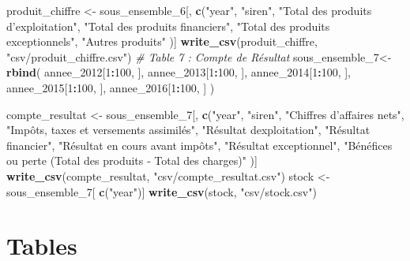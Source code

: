 \documentclass[mstat,12pt]{unswthesis}
\newenvironment{Shaded}{\begin{snugshade}}{\end{snugshade}}
\newcommand{\CommentTok}[1]{\textcolor[rgb]{0.56,0.35,0.01}{\textit{#1}}}
\newcommand{\DecValTok}[1]{\textcolor[rgb]{0.00,0.00,0.81}{#1}}
\newcommand{\FunctionTok}[1]{\textcolor[rgb]{0.13,0.29,0.53}{\textbf{#1}}}
\newcommand{\NormalTok}[1]{#1}
\newcommand{\OtherTok}[1]{\textcolor[rgb]{0.56,0.35,0.01}{#1}}
\newcommand{\SpecialCharTok}[1]{\textcolor[rgb]{0.81,0.36,0.00}{\textbf{#1}}}
\newcommand{\StringTok}[1]{\textcolor[rgb]{0.31,0.60,0.02}{#1}}
\begin{document}
\begin{Shaded}
\begin{Highlighting}[]
\NormalTok{produit\_chiffre }\OtherTok{\textless{}{-}}\NormalTok{ sous\_ensemble\_6[, }\FunctionTok{c}\NormalTok{(}\StringTok{"year"}\NormalTok{,}
  \StringTok{"siren"}\NormalTok{, }
  \StringTok{"Total des produits d’exploitation"}\NormalTok{, }
  \StringTok{"Total des produits financiers"}\NormalTok{, }
  \StringTok{"Total des produits exceptionnels"}\NormalTok{, }
  \StringTok{"Autres produits"}
\NormalTok{)]}
\FunctionTok{write\_csv}\NormalTok{(produit\_chiffre, }\StringTok{"csv/produit\_chiffre.csv"}\NormalTok{)}
\CommentTok{\# Table 7 : Compte de Résultat}
\NormalTok{sous\_ensemble\_7}\OtherTok{\textless{}{-}} \FunctionTok{rbind}\NormalTok{(}
\NormalTok{  annee\_2012[}\DecValTok{1}\SpecialCharTok{:}\DecValTok{100}\NormalTok{, ],}
\NormalTok{  annee\_2013[}\DecValTok{1}\SpecialCharTok{:}\DecValTok{100}\NormalTok{, ],}
\NormalTok{  annee\_2014[}\DecValTok{1}\SpecialCharTok{:}\DecValTok{100}\NormalTok{, ],}
\NormalTok{  annee\_2015[}\DecValTok{1}\SpecialCharTok{:}\DecValTok{100}\NormalTok{, ],}
\NormalTok{  annee\_2016[}\DecValTok{1}\SpecialCharTok{:}\DecValTok{100}\NormalTok{, ]}
\NormalTok{)}

\NormalTok{compte\_resultat }\OtherTok{\textless{}{-}}\NormalTok{ sous\_ensemble\_7[, }\FunctionTok{c}\NormalTok{(}\StringTok{"year"}\NormalTok{,}
  \StringTok{"siren"}\NormalTok{, }
  \StringTok{"Chiffres d’affaires nets"}\NormalTok{, }
  \StringTok{"Impôts, taxes et versements assimilés"}\NormalTok{, }
  \StringTok{"Résultat d\textquotesingle{}exploitation"}\NormalTok{, }
  \StringTok{"Résultat financier"}\NormalTok{, }
  \StringTok{"Résultat en cours avant impôts"}\NormalTok{, }
  \StringTok{"Résultat exceptionnel"}\NormalTok{, }
  \StringTok{"Bénéfices ou perte (Total des produits ‐ Total des charges)"}
\NormalTok{)]}
\FunctionTok{write\_csv}\NormalTok{(compte\_resultat, }\StringTok{"csv/compte\_resultat.csv"}\NormalTok{)}
\NormalTok{stock }\OtherTok{\textless{}{-}}\NormalTok{ sous\_ensemble\_7[ }\FunctionTok{c}\NormalTok{(}\StringTok{"year"}\NormalTok{)]}
\FunctionTok{write\_csv}\NormalTok{(stock, }\StringTok{"csv/stock.csv"}\NormalTok{)}
\end{Highlighting}
\end{Shaded}

\normalsize

\section*{\texorpdfstring{\textbf{Tables}}{Tables}}\label{tables}
\end{document}
